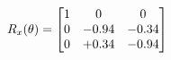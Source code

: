 \documentclass[preview]{standalone}
\begin{document}
\begin{align*}
\special{dvisvgm:raw <g id='unique000'>}R_{x}(\theta) = \begin{bmatrix}1 & 0 & 0 \\0 & -0.94 & -0.34 \\0 & +0.34 & -0.94\end{bmatrix}\special{dvisvgm:raw </g>}
\end{align*}
\end{document}
